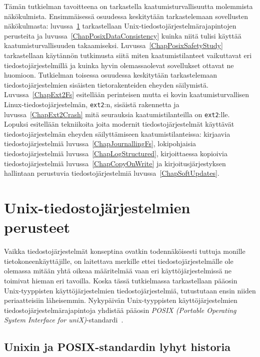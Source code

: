 Tämän tutkielman tavoitteena on tarkastella kaatumisturvallisuutta molemmista näkökulmista.
Ensimmäisessä osuudessa keskitytään tarkastelemaan sovellusten näkökulmasta:
luvussa~\ref{ChapUnixFsBasics} tarkastellaan Unix-tiedosto\-järjestelmärajapintojen perusteita ja luvussa~\ref{ChapPosixDataConsistency} kuinka niitä tulisi käyttää kaatumisturvallisuuden takaamiseksi.
Luvussa~\ref{ChapPosixSafetyStudy} tarkastellaan käytännön tutkimusta siitä miten kaatumistilanteet vaikuttavat eri tiedostojärjestelmillä ja kuinka hyvin olemassaolevat sovellukset ottavat ne huomioon.
Tutkielman toisessa osuudessa keskitytään tarkastelemaan tiedostojärjestelmien sisäisten tietorakenteiden eheyden säilymistä.
Luvussa~\ref{ChapExt2Fs} esitellään perinteisen mutta ei kovin kaatumisturvallisen Linux-tiedostojärjestelmän, \texttt{ext2}:n, sisäistä rakennetta ja luvussa~\ref{ChapExt2Crash} mitä seurauksia kaatumistilanteilla on \texttt{ext2}:lle.
Lopuksi esitellään tekniikoita joita modernit tiedostojärjestelmät käyttävät tiedostojärjestelmän eheyden säilyttämiseen kaatumistilanteissa: kirjaavia tiedostojärjestelmiä luvussa~\ref{ChapJournallingFs}, lokipohjaisia tiedostojärjestelmiä luvussa~\ref{ChapLogStructured}, kirjoittaessa kopioivia tiedostojärjestelmiä luvussa~\ref{ChapCopyOnWrite} ja kirjoitusjärjestyksen hallintaan perustuvia tiedostojärjestelmiä luvussa~\ref{ChapSoftUpdates}.

\section{Unix-tiedostojärjestelmien perusteet}
\label{ChapUnixFsBasics}

Vaikka tiedostojärjestelmät konseptina ovatkin todennäköisesti tuttuja monille tietokoneenkäyttäjille,
on laitettava merkille ettei tiedostojärjestelmälle ole olemassa mitään yhtä oikeaa määritelmää
vaan eri käyttöjärjestelmissä ne toimivat hieman eri tavoilla.
Koska tässä tutkielmassa tarkastellaan pääosin Unix-tyyppisten käyttöjärjestelmien tiedostojärjestelmiä,
tutustutaan ensin niiden periaatteisiin läheisemmin.
Nykypäivän Unix-tyyppisten käyttöjärjestelmien tiedostojärjestelmärajapintoja yhdistää pääosin \emph{POSIX (Portable Operating System Interface for uniX)}-standardi~\cite{PosixSpec}.

\subsection{Unixin ja POSIX-standardin lyhyt historia}

